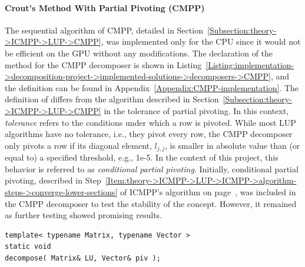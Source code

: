 \paragraph{Crout's Method With Partial Pivoting (CMPP)} The sequential algorithm of CMPP, detailed in Section~\ref{Subsection:theory->ICMPP->LUP->CMPP}, was implemented only for the CPU since it would not be efficient on the GPU without any modifications. The declaration of the  method for the CMPP decomposer is shown in Listing~\ref{Listing:implementation->decomposition-project->implemented-solutions->decomposers->CMPP}, and the definition can be found in Appendix~\ref{Appendix:CMPP-implementation}. The definition of  differs from the algorithm described in Section~\ref{Subsection:theory->ICMPP->LUP->CMPP} in the tolerance of partial pivoting. In this context, \textit{tolerance} refers to the conditions under which a row is pivoted. While most LUP algorithms have no tolerance, i.e., they pivot every row, the CMPP decomposer only pivots a row if its diagonal element, $l_{j,j}$, is smaller in absolute value than (or equal to) a specified threshold, e.g., 1e-5. In the context of this project, this behavior is referred to as \textit{conditional partial pivoting}. Initially, conditional partial pivoting, described in Step~\ref{Item:theory->ICMPP->LUP->ICMPP->algorithm-steps->converge-lower-sections} of ICMPP's algorithm on page~\pageref{Item:theory->ICMPP->LUP->ICMPP->algorithm-steps->converge-lower-sections}, was included in the CMPP decomposer to test the stability of the concept. However, it remained as further testing showed promising results.

\begin{lstlisting}[caption={The declaration of the \code{decompose()} method for the CMPP decomposer. On input, matrix \code{LU} is assumed to contain the values of $\mathbf{A}$, and \code{piv} is expected to be appropriately sized. On output, matrix \code{LU} contains the values of matrices $\mathbf{L}$ and $\mathbf{U}$ in the format presented in Equation~\ref{Equation:implementation->decomposition-project->implemented-solutions->decomposers->CMPP}, and \code{piv} contains the row permutations in the format set by cuSOLVER and cuBLAS, i.e., row \code{i} was swapped with row \code{piv[i]} \cite{5D33zKi5iStCty0r}. The template parameters, \code{Matrix} and \code{Vector}, are expected to be data structures from TNL that inherit from the \code{TNL::Matrices::DenseMatrix} and \code{TNL::Containers::Vector} types, respectively.},label={Listing:implementation->decomposition-project->implemented-solutions->decomposers->CMPP}]
template< typename Matrix, typename Vector >
static void
decompose( Matrix& LU, Vector& piv );
\end{lstlisting}

